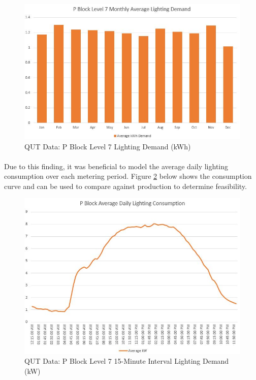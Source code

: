\begin{figure}[H]
	\hfill\includegraphics[width = 150mm]{images/metering/pme/pblock-lvl7-monthly-kwh}\hspace*{\fill}
	\caption{QUT Data: P Block Level 7 Lighting Demand (kWh)} 
	\label{fig:pblock-lvl7-monthly-kwh}
\end{figure} 

\paragraph{}
Due to this finding, it was beneficial to model the average daily lighting consumption over each metering period. Figure \ref{fig:pblock-lvl7-15-minute} below shows the consumption curve and can be used to compare against production to determine feasibility.  

\begin{figure}[H]
	\hfill\includegraphics[width = 150mm]{images/metering/pme/pblock-lvl7-daily-avg-kw}\hspace*{\fill}
	\caption{QUT Data: P Block Level 7 15-Minute Interval Lighting Demand (kW)} 
	\label{fig:pblock-lvl7-15-minute}
\end{figure}

\newpage
